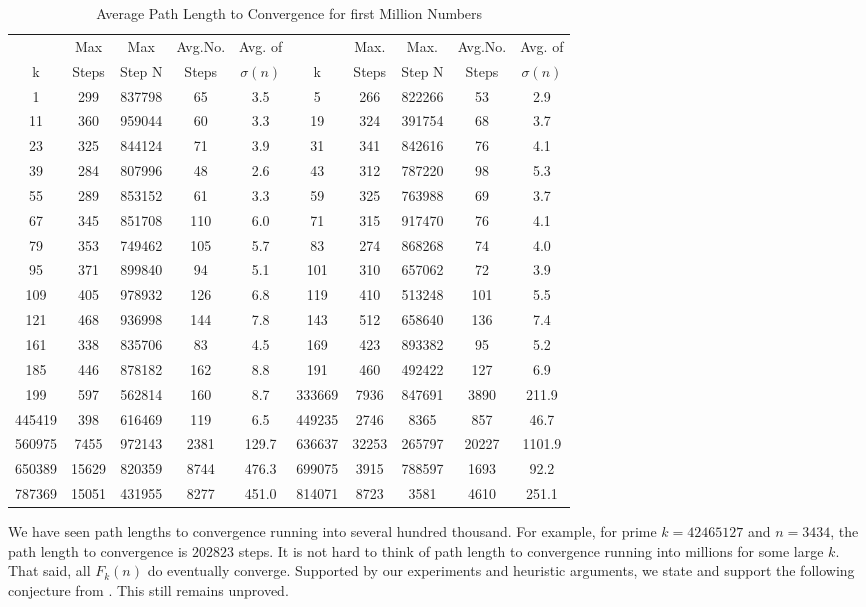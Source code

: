 \documentclass[12pt]{article} %
\begin{document}
\begin{table}[H]
    \centering
    \tiny
    \noindent
    \begin{tabular}{|c|c|c|c|c||c|c|c|c|c|}
    \hline
 & Max & Max & Avg.No. & Avg. of   & & Max. & Max. & Avg.No. & Avg. of\\
 k & Steps & Step N & Steps & $\sigma(n)$ & k & Steps & Step N & Steps & $\sigma(n)$\\
\hline
1 & 299 & 837798 & 65 & 3.5 & 5 & 266 & 822266 & 53 & 2.9\\
11 & 360 & 959044 & 60 & 3.3 &19 & 324 & 391754 & 68 & 3.7\\
23 & 325 & 844124 & 71 & 3.9 & 31 & 341 & 842616 & 76 & 4.1\\

39 & 284 & 807996 & 48 & 2.6 & 43 & 312 & 787220 & 98 & 5.3\\
55 & 289 & 853152 & 61 & 3.3 & 59 & 325 & 763988 & 69 & 3.7\\
67 & 345 & 851708 & 110 & 6.0 & 71 & 315 & 917470 & 76 & 4.1\\
79 & 353 & 749462 & 105 & 5.7 & 83 & 274 & 868268 & 74 & 4.0\\
95 & 371 & 899840 & 94 & 5.1 & 101 & 310 & 657062 & 72 & 3.9\\
109 & 405 & 978932 & 126 & 6.8 & 119 & 410 & 513248 & 101 & 5.5\\
121 & 468 & 936998 & 144 & 7.8 & 143 & 512 & 658640 & 136 & 7.4\\
161 & 338 & 835706 & 83 & 4.5 & 169 & 423 & 893382 & 95 & 5.2\\
185 & 446 & 878182 & 162 & 8.8 & 191 & 460 & 492422 & 127 & 6.9\\
199 & 597 & 562814 & 160 & 8.7 & 333669 & 7936 & 847691 & 3890 & 211.9\\
445419 & 398 & 616469 & 119 & 6.5 & 449235 & 2746 & 8365 & 857 & 46.7\\
560975 & 7455 & 972143 & 2381 & 129.7 & 636637 & 32253 & 265797 & 20227 & 1101.9\\
650389 & 15629 & 820359 & 8744 & 476.3 & 699075 & 3915 & 788597 & 1693 & 92.2\\
787369 & 15051 & 431955 & 8277 & 451.0 & 814071 & 8723 & 3581 & 4610 & 251.1\\
\hline
\end{tabular}
\caption{Average Path Length to Convergence for first Million Numbers}
\label{tab:convergence}
\end{table}

We have seen path lengths to convergence running into several hundred thousand. For example, for prime $k = 42465127$ and $n=3434$, the path length to convergence is $202823$ steps. It is not hard to think of path length to convergence running into millions for some large $k$. That said, all $F_k(n)$ do eventually converge. Supported by our experiments and heuristic arguments, we state and support the following conjecture from \cite{lagaris90}. This still remains unproved.
\newline
\end{document}
